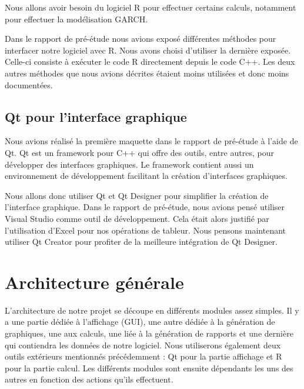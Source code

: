 \documentclass[a4paper]{report}
\begin{document}
Nous allons avoir besoin du logiciel R pour effectuer certains calculs, notamment pour effectuer la modélisation GARCH.

Dans le rapport de pré-étude nous avions exposé différentes méthodes pour interfacer notre logiciel avec R.
Nous avons choisi d'utiliser la dernière exposée.
Celle-ci consiste à exécuter le code R directement depuis le code C++.
Les deux autres méthodes que nous avions décrites étaient moins utilisées et donc moins documentées.


\subsection{Qt pour l'interface graphique}

Nous avions réalisé la première maquette dans le rapport de pré-étude à l'aide de Qt.
Qt est un framework pour C++ qui offre des outils, entre autres, pour développer des interfaces graphiques.
Le framework contient aussi un environnement de développement facilitant la création d'interfaces graphiques.

Nous allons donc utiliser Qt et Qt Designer pour simplifier la création de l'interface graphique.
Dans le rapport de pré-étude, nous avions pensé utiliser Visual Studio comme outil de développement.
Cela était alors justifié par l'utilisation d'Excel pour nos opérations de tableur.
Nous pensons maintenant utiliser Qt Creator pour profiter de la meilleure intégration de Qt Designer.



\section{Architecture générale}

L'architecture de notre projet se découpe en différents modules assez simples.
Il y a une partie dédiée à l'affichage (GUI), une autre dédiée à la génération de graphiques, une aux calculs, une liée à la génération de rapports et une dernière qui contiendra les données de notre logiciel.
Nous utiliserons également deux outils extérieurs mentionnés précédemment : Qt pour la partie affichage et R pour la partie calcul.
Les différents modules sont ensuite dépendants les uns des autres en fonction des actions qu'ils effectuent.
\end{document}
